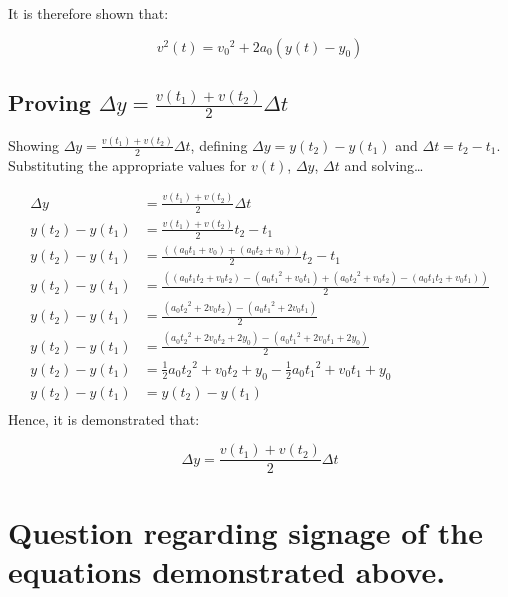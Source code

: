 \documentclass[letterpaper]{article}
\begin{document}
It is therefore shown that:

\begin{equation}
    v^2(t) = {v_0}^2 + 2a_0 (y(t) - y_0) 
\end{equation}

\subsection{Proving \(\Delta y = \frac{v(t_1)+v(t_2)}{2}\Delta t\)}
\label{sec:org0962baa}
Showing \(\Delta y = \frac{v(t_1)+v(t_2)}{2}\Delta t\), defining \(\Delta y=y(t_2)-y(t_1)\) and \(\Delta t = t_2 - t_1\). Substituting the appropriate values for \(v(t)\), \(\Delta y\), \(\Delta t\) and solving\ldots{}

\begin{align}
    \Delta y &= \frac{v(t_1)+v(t_2)}{2}\Delta t \\
    y(t_2)-y(t_1) &= \frac{v(t_1)+v(t_2)}{2} t_2 - t_1 \\
    y(t_2)-y(t_1) &= \frac{((a_0t_1+v_0)+(a_0t_2+v_0))}{2} t_2 - t_1 \\
    y(t_2)-y(t_1) &= \frac{((a_0t_1t_2+v_0t_2)-(a_0{t_1}^2+v_0t_1)+(a_0{t_2}^2+v_0t_2)-(a_0t_1t_2+v_0t_1))}{2} \\
    y(t_2)-y(t_1) &= \frac{(a_0{t_2}^2+2v_0t_2)-(a_0{t_1}^2+2v_0t_1)}{2} \\
    y(t_2)-y(t_1) &= \frac{(a_0{t_2}^2+2v_0t_2+2y_0)-(a_0{t_1}^2+2v_0t_1+2y_0)}{2} \\
    y(t_2)-y(t_1) &= \frac{1}{2} a_0{t_2}^2+v_0t_2+y_0 - \frac{1}{2} a_0{t_1}^2+v_0t_1+y_0 \\
    y(t_2)-y(t_1) &= y(t_2) - y(t_1) \\
\end{align}
Hence, it is demonstrated that: 

\begin{equation}
    \Delta y = \frac{v(t_1)+v(t_2)}{2}\Delta t
\end{equation}

\section{Question regarding signage of the equations demonstrated above.}
\label{sec:org36125e8}
\end{document}

